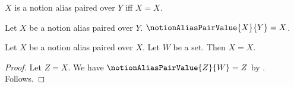 

\begin{definition}\label{notion_alias_paired}
    $X$ is a notion alias paired over $Y$ iff $X=X$.
\end{definition}

\begin{definition}\label{notion_alias_pair_value}
    Let $X$ be a notion alias paired over $Y$.
    $\notionAliasPairValue{X}{Y}=X$.
\end{definition}

\begin{proposition}\label{notion_alias_repeated_negative}
    Let $X$ be a notion alias paired over $X$.
    Let $W$ be a set.
    Then $X=X$.
\end{proposition}
\begin{proof}
    Let $Z=X$.
    We have $\notionAliasPairValue{Z}{W}=Z$
        by .
    Follows.
\end{proof}
